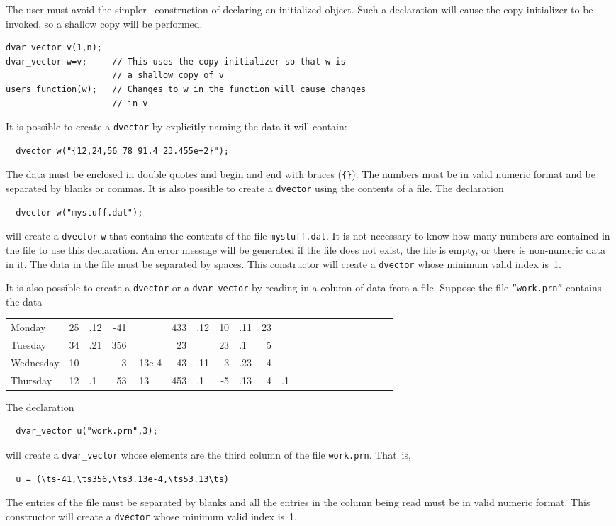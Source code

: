 \documentclass{admbmanual}
\makeatletter
\newenvironment{daysdecimaltable}
  {
    \par
    \medskip
    \begin{tabular}{l @{\qquad} *{10}{r@{}l} }
  }
  {
    \end{tabular}
    \bigskip
    \par
  }
\makeatother
\begin{document}
The user must avoid the simpler \cplus\ construction
of declaring an initialized object. Such a declaration
will cause the copy initializer to be invoked, so a shallow
copy will be performed.
\begin{lstlisting}
dvar_vector v(1,n);  
dvar_vector w=v;     // This uses the copy initializer so that w is
                     // a shallow copy of v 
users_function(w);   // Changes to w in the function will cause changes 
                     // in v
\end{lstlisting}

It is possible to create a \texttt{dvector} by explicitly naming the
data it will contain: 
\begin{lstlisting}
  dvector w("{12,24,56 78 91.4 23.455e+2}"); 
\end{lstlisting}

The data must be enclosed in double quotes and begin and end with
braces (\texttt{\{{}\}}). The numbers must be in valid numeric
format and be separated by blanks or commas. 
It is also possible to create a \texttt{dvector} using the contents of a file.
The declaration
\begin{lstlisting}
  dvector w("mystuff.dat");
\end{lstlisting}
will create a \texttt{dvector} \texttt{w} that contains the contents of
the file \texttt{mystuff.dat}. It is not necessary to know how many numbers
are contained in the file to use this declaration. 
An error message will be generated if
the file does not exist, the file is empty, or there is non-numeric data in it. The data in the file must be separated by spaces. 
This constructor will create a \texttt{dvector} whose minimum valid
index is~1.

It is also possible to create a \texttt{dvector} or a \texttt{dvar\_vector}
by reading in a column of data from a file. Suppose the file
\texttt{``work.prn''} contains the data
\begin{daysdecimaltable}
  Monday         &  25&.12   &  -41&                 & 433&.12          &  10&.11      & 23& \\
  Tuesday        & 34&.21    &   356&               &  23&                  &  23&.1         &  5& \\
  Wednesday  & 10&        &    3&.13e-4        & 43&.11            &  3&.23         &  4& \\
  Thursday      & 12&.1      &    53&.13          & 453&.1            &  -5&.13       &  4&.1 \\
\end{daysdecimaltable}
The declaration
\begin{lstlisting}
  dvar_vector u("work.prn",3);
\end{lstlisting}
will create a \texttt{dvar\_vector} whose elements are the
third column of the file \texttt{work.prn}. That~is,
\begin{lstlisting}
  u = (\ts-41,\ts356,\ts3.13e-4,\ts53.13\ts)
\end{lstlisting}
The entries of the file
must be separated by blanks and all the entries in the column being
read must be in valid numeric format.
This constructor will create a \texttt{dvector} whose minimum valid
index is~1.
\end{document}
